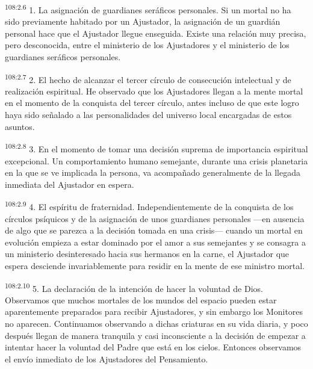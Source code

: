 \documentclass[twoside, 11pt]{book}
\begin{document}
\par
\textsuperscript{108:2.6} 1. La asignación de guardianes seráficos personales. Si un mortal no ha sido previamente habitado por un Ajustador, la asignación de un guardián personal hace que el Ajustador llegue enseguida. Existe una relación muy precisa, pero desconocida, entre el ministerio de los Ajustadores y el ministerio de los guardianes seráficos personales.

\par
\textsuperscript{108:2.7} 2. El hecho de alcanzar el tercer círculo de consecución intelectual y de realización espiritual. He observado que los Ajustadores llegan a la mente mortal en el momento de la conquista del tercer círculo, antes incluso de que este logro haya sido señalado a las personalidades del universo local encargadas de estos asuntos.

\par
\textsuperscript{108:2.8} 3. En el momento de tomar una decisión suprema de importancia espiritual excepcional. Un comportamiento humano semejante, durante una crisis planetaria en la que se ve implicada la persona, va acompañado generalmente de la llegada inmediata del Ajustador en espera.

\par
\textsuperscript{108:2.9} 4. El espíritu de fraternidad. Independientemente de la conquista de los círculos psíquicos y de la asignación de unos guardianes personales ---en ausencia de algo que se parezca a la decisión tomada en una crisis--- cuando un mortal en evolución empieza a estar dominado por el amor a sus semejantes y se consagra a un ministerio desinteresado hacia sus hermanos en la carne, el Ajustador que espera desciende invariablemente para residir en la mente de ese ministro mortal.

\par
\textsuperscript{108:2.10} 5. La declaración de la intención de hacer la voluntad de Dios. Observamos que muchos mortales de los mundos del espacio pueden estar aparentemente preparados para recibir Ajustadores, y sin embargo los Monitores no aparecen. Continuamos observando a dichas criaturas en su vida diaria, y poco después llegan de manera tranquila y casi inconsciente a la decisión de empezar a intentar hacer la voluntad del Padre que está en los cielos. Entonces observamos el envío inmediato de los Ajustadores del Pensamiento.
\end{document}
